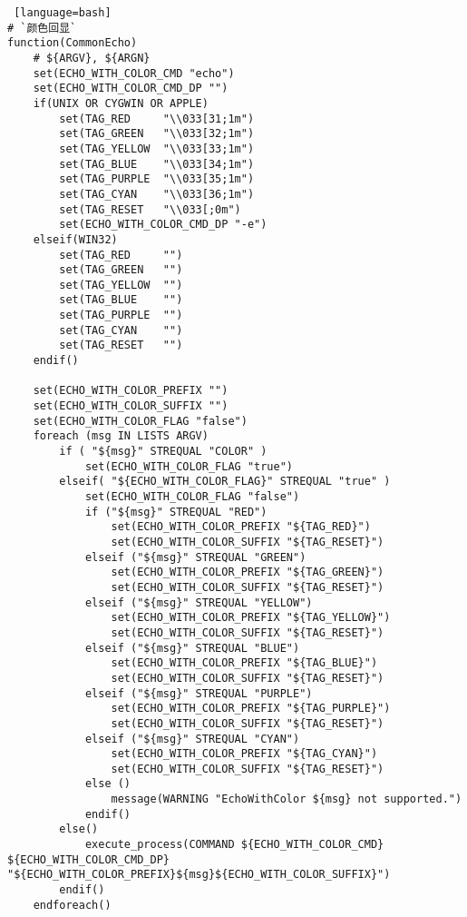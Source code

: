 {\begin{lstlisting} [language=bash]
# `颜色回显`
function(CommonEcho)
    # ${ARGV}, ${ARGN}
    set(ECHO_WITH_COLOR_CMD "echo")
    set(ECHO_WITH_COLOR_CMD_DP "")
    if(UNIX OR CYGWIN OR APPLE)
        set(TAG_RED     "\\033[31;1m")
        set(TAG_GREEN   "\\033[32;1m")
        set(TAG_YELLOW  "\\033[33;1m")
        set(TAG_BLUE    "\\033[34;1m")
        set(TAG_PURPLE  "\\033[35;1m")
        set(TAG_CYAN    "\\033[36;1m")
        set(TAG_RESET   "\\033[;0m")
        set(ECHO_WITH_COLOR_CMD_DP "-e")
    elseif(WIN32)
        set(TAG_RED     "")
        set(TAG_GREEN   "")
        set(TAG_YELLOW  "")
        set(TAG_BLUE    "")
        set(TAG_PURPLE  "")
        set(TAG_CYAN    "")
        set(TAG_RESET   "")
    endif()

    set(ECHO_WITH_COLOR_PREFIX "")
    set(ECHO_WITH_COLOR_SUFFIX "")
    set(ECHO_WITH_COLOR_FLAG "false")
    foreach (msg IN LISTS ARGV)
        if ( "${msg}" STREQUAL "COLOR" )
            set(ECHO_WITH_COLOR_FLAG "true")
        elseif( "${ECHO_WITH_COLOR_FLAG}" STREQUAL "true" )
            set(ECHO_WITH_COLOR_FLAG "false")
            if ("${msg}" STREQUAL "RED")
                set(ECHO_WITH_COLOR_PREFIX "${TAG_RED}")
                set(ECHO_WITH_COLOR_SUFFIX "${TAG_RESET}")
            elseif ("${msg}" STREQUAL "GREEN")
                set(ECHO_WITH_COLOR_PREFIX "${TAG_GREEN}")
                set(ECHO_WITH_COLOR_SUFFIX "${TAG_RESET}")
            elseif ("${msg}" STREQUAL "YELLOW")
                set(ECHO_WITH_COLOR_PREFIX "${TAG_YELLOW}")
                set(ECHO_WITH_COLOR_SUFFIX "${TAG_RESET}")
            elseif ("${msg}" STREQUAL "BLUE")
                set(ECHO_WITH_COLOR_PREFIX "${TAG_BLUE}")
                set(ECHO_WITH_COLOR_SUFFIX "${TAG_RESET}")
            elseif ("${msg}" STREQUAL "PURPLE")
                set(ECHO_WITH_COLOR_PREFIX "${TAG_PURPLE}")
                set(ECHO_WITH_COLOR_SUFFIX "${TAG_RESET}")
            elseif ("${msg}" STREQUAL "CYAN")
                set(ECHO_WITH_COLOR_PREFIX "${TAG_CYAN}")
                set(ECHO_WITH_COLOR_SUFFIX "${TAG_RESET}")
            else ()
                message(WARNING "EchoWithColor ${msg} not supported.")
            endif()
        else()
            execute_process(COMMAND ${ECHO_WITH_COLOR_CMD} ${ECHO_WITH_COLOR_CMD_DP} "${ECHO_WITH_COLOR_PREFIX}${msg}${ECHO_WITH_COLOR_SUFFIX}")
        endif()
    endforeach()


\end{lstlisting}}
